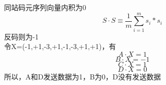 \documentclass{article}
\begin{document}
\begin{enumerate}
          同站码元序列向量内积为0
          \begin{equation}
            S \cdot S \equiv \frac{1}{m}\sum_{i=1}^{m}s_i*s_i
          \end{equation}
          反码则为-1\\
          令X=(-1,+1,-3,+1,-1,-3,+1,+1)，有
          \begin{equation}
            A \cdot X =1
          \end{equation}
          \begin{equation}
            B \cdot X =-1
          \end{equation}
          \begin{equation}
            C \cdot X =1
          \end{equation}
          \begin{equation}
            D \cdot X =0
          \end{equation}
          所以，A和D发送数据为1，B为0，D没有发送数据
\end{enumerate}
\end{document}
